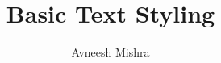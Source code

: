 

\title{Basic Text Styling}
\author{Avneesh Mishra}


    \maketitle
    \tableofcontents
    \pagebreak
    
    \pagebreak
    
    \pagebreak

